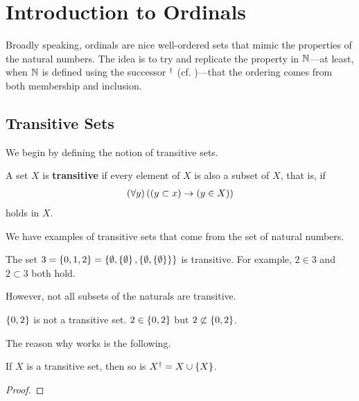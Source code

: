 \section{Introduction to Ordinals}

Broadly speaking, ordinals are nice well-ordered sets that mimic the properties of the natural numbers. The idea is to try and replicate the property in $\mathbb{N}$---at least, when $\mathbb{N}$ is defined using the successor $^{\dagger}$ (cf. )---that the ordering comes from both membership and inclusion.

\subsection{Transitive Sets}

We begin by defining the notion of transitive sets.

\begin{boxdefinition}[Transitivity]
    A set $X$ is \textbf{transitive} if every element of $X$ is also a subset of $X$, that is, if
    \begin{align*}
        \left( \forall y \right)\left( \left( y \subset x \right) \to \left( y \in X \right) \right)
    \end{align*}
    holds in $X$.
\end{boxdefinition}

We have examples of transitive sets that come from the set of natural numbers.

\begin{boxexample}\label{Ch3:Eg:3_trans}
    The set $3 = \left\{ 0, 1, 2 \right\} = \left\{ \emptyset, \left\{ \emptyset \right\}, \left\{ \emptyset, \left\{ \emptyset \right\} \right\} \right\}$ is transitive. For example, $2 \in 3$ and $2 \subset 3$ both hold.
\end{boxexample}

However, not all subsets of the naturals are transitive.

\begin{boxnexample}
    $\left\{ 0, 2 \right\}$ is not a transitive set. $2 \in \left\{ 0, 2 \right\}$ but $2 \not\subset \left\{ 0, 2 \right\}$.
\end{boxnexample}

The reason why  works is the following.

\begin{boxlemma}\label{Ch2:Lemma:succ_trans}
    If $X$ is a transitive set, then so is $X^{\dagger} = X \cup \left\{ X \right\}$.
\end{boxlemma}
\begin{proof}
    \sorry
\end{proof}

